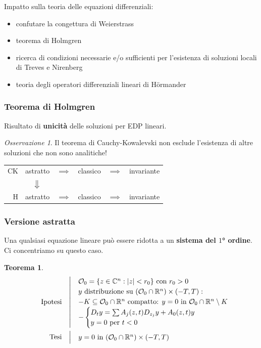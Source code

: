\documentclass[serif,notheorems]{beamer}
\makeatletter
\newenvironment{ipotesi}%
{\quad\left|\quad\def\arraystretch{1.2}\begin{array}{@{}l@{}}}%
{\end{array}\right.}
\newcommand{\hpth}[2]
{
\begin{align*}
\quad
\text{Ipotesi}
&\begin{ipotesi}
#1
\end{ipotesi}\\
\text{Tesi}
&\begin{ipotesi}
#2
\end{ipotesi}
\end{align*}
}
\theoremstyle{definition} %
\newtheorem{theorem}{Teorema}[section] %
\theoremstyle{remark}
\newtheorem*{remark}{Osservazione}
\makeatother
\begin{document}
\begin{frame}
Impatto sulla teoria delle equazioni differenziali:
\begin{itemize}
\item confutare la congettura di Weierstrass
\item teorema di Holmgren
\item ricerca di condizioni necessarie e/o sufficienti per l'esistenza di soluzioni locali di Treves e Nirenberg
\item teoria degli operatori differenziali lineari di Hörmander
\end{itemize}
\end{frame}

\begin{frame}
\frametitle{Teorema di Holmgren}
Risultato di \textbf{unicità} delle soluzioni per EDP lineari.
\begin{remark}
Il teorema di Cauchy-Kowalevski non esclude l'esistenza di altre soluzioni che non sono analitiche!
\end{remark}
\end{frame}

\begin{frame}
\begin{table}
\renewcommand{\arraystretch}{1.5}
\begin{tabular}{r||ccccc} 
CK & astratto & $\implies$  & classico & $\implies$ & invariante\\
&$\big\Downarrow$ &&&&\\
H & astratto & $\implies$ & classico & $\implies$ & invariante\\
\end{tabular}
\end{table}
\end{frame}

\begin{frame}
\frametitle{Versione astratta}
Una qualsiasi equazione lineare può essere ridotta a un \textbf{sistema del $1$° ordine}. Ci concentriamo su questo caso. 
\begin{theorem}
\vspace{-5mm}
\hpth{
\mathcal{O}_0= \{ z\in \mathbb{C}^n: |z|<r_0 \} \text{ con } r_0>0\\
y \text{ distribuzione su } (\mathcal{O}_0 \cap \mathbb{R}^n) \times (-T,T):\\
- K\subseteq  \mathcal{O}_0 \cap \mathbb{R}^n \text{ compatto: } y=0  \text{ in } \mathcal{O}_0 \cap \mathbb{R}^n \setminus K\\
- \begin{cases}
D_t y = \sum A_j (z,t) D_{z_j}y+A_0(z,t)y \\
y=0 \text{ per } t<0
\end{cases}\\
}{
y = 0 \text{ in } (\mathcal{O}_0 \cap \mathbb{R}^n) \times (-T,T) \\
}
\end{theorem}
\end{frame}
\end{document}
